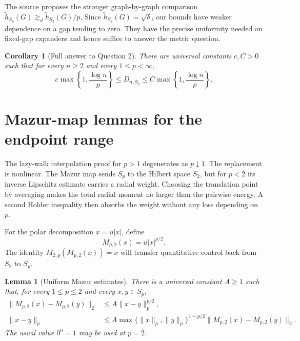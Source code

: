 \documentclass[11pt]{article}
\newtheorem{corollary}[theorem]{Corollary}
\newtheorem{lemma}[theorem]{Lemma}
\begin{document}
The source proposes the stronger graph-by-graph comparison
$\widetilde h_{S_p}(G)\gtrsim_d\widetilde h_{S_2}(G)/p$.  Since
$\widetilde h_{S_2}(G)=\sqrt\delta$, our bounds have weaker dependence on
a gap tending to zero.  They have the precise uniformity needed on
fixed-gap expanders and hence suffice to answer the metric question.

\begin{corollary}[Full answer to Question 2]\label{cor:distortion}
There are universal constants $c,C>0$ such that for every $n\ge2$ and
every $1\le p<\infty$,
\[
 c\max\left\{1,\frac{\log n}{p}\right\}
 \le D_{n,S_p}\le
 C\max\left\{1,\frac{\log n}{p}\right\}.
\]
\end{corollary}

\section{Mazur-map lemmas for the endpoint range}

The lazy-walk interpolation proof for $p>1$ degenerates as $p\downarrow1$.
The replacement is nonlinear.  The Mazur map sends $S_p$ to the Hilbert
space $S_2$, but for $p<2$ its inverse Lipschitz estimate carries a
radial weight.  Choosing the translation point by averaging makes the
total radial moment no larger than the pairwise energy.  A second Holder
inequality then absorbs the weight without any loss depending on $p$.

For the polar decomposition $x=u|x|$, define
\[
 M_{p,2}(x)=u|x|^{p/2}.
\]
The identity $M_{2,p}(M_{p,2}(x))=x$ will transfer quantitative control
back from $S_2$ to $S_p$.

\begin{lemma}[Uniform Mazur estimates]\label{lem:mazur}
There is a universal constant $A\ge1$ such that, for every
$1\le p\le2$ and every $x,y\in S_p$,
\begin{align}
 \|M_{p,2}(x)-M_{p,2}(y)\|_2
 &\le A\|x-y\|_p^{p/2},\label{eq:mazur-forward}\\
 \|x-y\|_p
 &\le A\max\{\|x\|_p,\|y\|_p\}^{1-p/2}
       \|M_{p,2}(x)-M_{p,2}(y)\|_2.\label{eq:mazur-inverse}
\end{align}
The usual value $0^0=1$ may be used at $p=2$.
\end{lemma}
\end{document}
